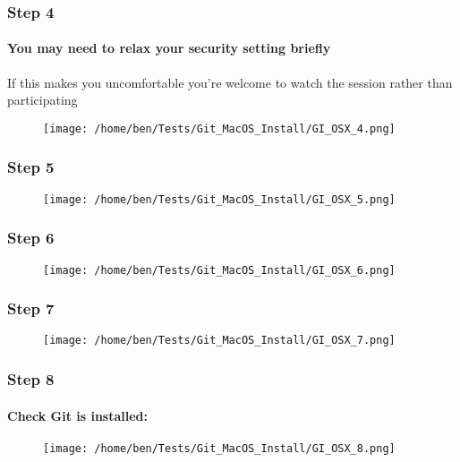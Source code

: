 \documentclass[xcolor=dvipsnames]{beamer}
\begin{document}
\begin{frame}
\frametitle{Step 4}
\framesubtitle{You may need to relax your security setting briefly}
If this makes you uncomfortable you're welcome to watch the session rather than participating
\begin{center}
\begin{figure}
\texttt{[image: /home/ben/Tests/Git\_MacOS\_Install/GI\_OSX\_4.png]}
\end{figure}
\end{center}
\end{frame}


\begin{frame}
\frametitle{Step 5}
\begin{center}
\begin{figure}
\texttt{[image: /home/ben/Tests/Git\_MacOS\_Install/GI\_OSX\_5.png]}
\end{figure}
\end{center}
\end{frame}

\begin{frame}
\frametitle{Step 6}
\begin{center}
\begin{figure}
\texttt{[image: /home/ben/Tests/Git\_MacOS\_Install/GI\_OSX\_6.png]}
\end{figure}
\end{center}
\end{frame}

\begin{frame}
\frametitle{Step 7}
\begin{center}
\begin{figure}
\texttt{[image: /home/ben/Tests/Git\_MacOS\_Install/GI\_OSX\_7.png]}
\end{figure}
\end{center}
\end{frame}

\begin{frame}
\frametitle{Step 8}
\framesubtitle{Check Git is installed:}
\begin{center}
\begin{figure}
\texttt{[image: /home/ben/Tests/Git\_MacOS\_Install/GI\_OSX\_8.png]}
\end{figure}
\end{center}
\end{frame}
\end{document}
